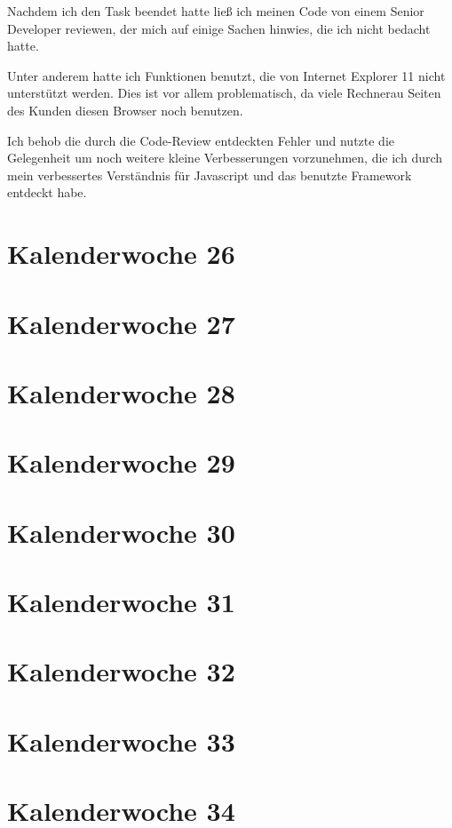 \documentclass[11pt]{article} %
\begin{document}
Nachdem ich den Task beendet hatte ließ ich meinen Code von einem Senior Developer reviewen, der mich auf einige Sachen hinwies, die ich nicht bedacht hatte.

Unter anderem hatte ich Funktionen benutzt, die von Internet Explorer 11 nicht unterstützt werden.
Dies ist vor allem problematisch, da viele Rechnerau Seiten des Kunden diesen Browser noch benutzen.

Ich behob die durch die Code-Review entdeckten Fehler und nutzte die Gelegenheit um noch weitere kleine Verbesserungen vorzunehmen, die ich durch mein verbessertes Verständnis für Javascript und das benutzte Framework entdeckt habe.

\section{Kalenderwoche 26} \label{sec:kw2}



\section{Kalenderwoche 27} \label{sec:kw2}
\section{Kalenderwoche 28} \label{sec:kw2}
\section{Kalenderwoche 29} \label{sec:kw2}
\section{Kalenderwoche 30} \label{sec:kw3}
\section{Kalenderwoche 31} \label{sec:kw3}
\section{Kalenderwoche 32} \label{sec:kw3}
\section{Kalenderwoche 33} \label{sec:kw3}
\section{Kalenderwoche 34} \label{sec:kw3}
\end{document}
